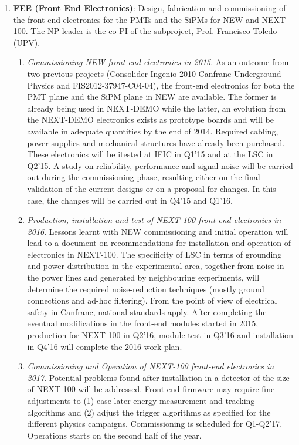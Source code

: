 \begin{enumerate}

\item {\bf FEE (Front End Electronics)}: Design, fabrication and commissioning of the front-end electronics for the PMTs and the SiPMs for NEW and NEXT-100. The NP leader is the co-PI of the subproject, Prof. Francisco Toledo (UPV).
\begin{enumerate}
\item	{\em Commissioning NEW front-end electronics in 2015}. As an outcome from two previous projects (Consolider-Ingenio 2010 Canfranc Underground Physics and FIS2012-37947-C04-04), the front-end electronics for both the PMT plane and the SiPM plane in NEW are available. The former is already being used in NEXT-DEMO while the latter, an evolution from the NEXT-DEMO electronics exists as prototype boards and will be available in adequate quantities by the end of 2014. Required cabling, power supplies and mechanical structures have already been purchased.
These electronics will be itested at IFIC in Q1’15 and at the LSC in Q2’15. A study on reliability, performance and signal noise will be carried out during the commissioning phase, resulting either on the final validation of the current designs or on a proposal for changes. In this case, the changes will be carried out in Q4’15 and Q1’16.

\item {\em Production, installation and test of NEXT-100 front-end electronics in 2016}. Lessons learnt with NEW commissioning and initial operation will lead to a document on recommendations for installation and operation of electronics in NEXT-100. The specificity of LSC in terms of grounding and power distribution in the experimental area, together from noise in the power lines and generated by neighbouring experiments, will determine the required noise-reduction techniques (mostly ground connections and ad-hoc filtering). From the point of view of electrical safety in Canfranc, national standards apply. After completing the eventual modifications in the front-end modules started in 2015, production for NEXT-100 in Q2’16, module test in Q3’16 and installation in Q4’16 will complete the 2016 work plan.

\item {\em Commissioning and Operation of NEXT-100 front-end electronics in 2017}. Potential problems found after installation in a detector of the size of NEXT-100 will be addressed. Front-end firmware may require fine adjustments to (1) ease later energy measurement and tracking algorithms and (2) adjust the trigger algorithms as specified for the different physics campaigns. Commissioning is scheduled for Q1-Q2’17. Operations starts on the second half of the year.


\end{enumerate}
\end{enumerate}
